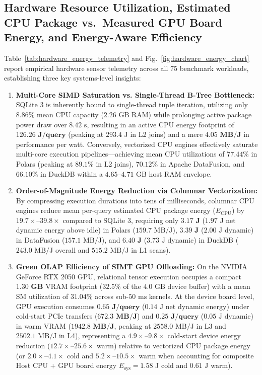 \documentclass[10pt,a4paper]{article}
\begin{document}
\subsection{Hardware Resource Utilization, Estimated CPU Package vs.\ Measured GPU Board Energy, and Energy-Aware Efficiency}
Table~\ref{tab:hardware_energy_telemetry} and Fig.~\ref{fig:hardware_energy_chart} report empirical hardware sensor telemetry across all 75 benchmark workloads, establishing three key systems-level insights:
\begin{enumerate}[leftmargin=1.5em,itemsep=2pt]
    \item \textbf{Multi-Core SIMD Saturation vs. Single-Thread B-Tree Bottleneck:} SQLite 3 is inherently bound to single-thread tuple iteration, utilizing only $8.86\%$ mean CPU capacity ($2.26\text{ GB}$ RAM) while prolonging active package power draw over $8.42\text{ s}$, resulting in an active CPU energy footprint of $\mathbf{126.26\text{ J/query}}$ (peaking at $293.4\text{ J}$ in L2 joins) and a mere $\mathbf{4.05\text{ MB/J}}$ in performance per watt. Conversely, vectorized CPU engines effectively saturate multi-core execution pipelines---achieving mean CPU utilizations of $\mathbf{77.44\%}$ in Polars (peaking at $89.1\%$ in L2 joins), $\mathbf{70.12\%}$ in Apache DataFusion, and $\mathbf{66.10\%}$ in DuckDB within a $4.65\text{--}4.71\text{ GB}$ host RAM envelope.
    \item \textbf{Order-of-Magnitude Energy Reduction via Columnar Vectorization:} By compressing execution durations into tens of milliseconds, columnar CPU engines reduce mean per-query estimated CPU package energy ($E_{\text{CPU}}$) by $19.7\times\text{--}39.8\times$ compared to SQLite 3, requiring only $\mathbf{3.17\text{ J}}$ ($1.97\text{ J}$ net dynamic energy above idle) in Polars ($159.7\text{ MB/J}$), $\mathbf{3.39\text{ J}}$ ($2.00\text{ J}$ dynamic) in DataFusion ($157.1\text{ MB/J}$), and $\mathbf{6.40\text{ J}}$ ($3.73\text{ J}$ dynamic) in DuckDB ($243.0\text{ MB/J}$ overall and $515.2\text{ MB/J}$ in L1 scans).
    \item \textbf{Green OLAP Efficiency of SIMT GPU Offloading:} On the NVIDIA GeForce RTX 2050 GPU, relational tensor execution occupies a compact $\mathbf{1.30\text{ GB}}$ VRAM footprint ($32.5\%$ of the $4.0\text{ GB}$ device buffer) with a mean SM utilization of $\mathbf{31.04\%}$ across sub-$50\text{ ms}$ kernels. At the device board level, GPU execution consumes $\mathbf{0.65\text{ J/query}}$ ($0.14\text{ J}$ net dynamic energy) under cold-start PCIe transfers ($\mathbf{672.3\text{ MB/J}}$) and $\mathbf{0.25\text{ J/query}}$ ($0.05\text{ J}$ dynamic) in warm VRAM ($\mathbf{1942.8\text{ MB/J}}$, peaking at $2558.0\text{ MB/J}$ in L3 and $2502.1\text{ MB/J}$ in L4), representing a $\mathbf{4.9\times\text{--}9.8\times}$ cold-start device energy reduction ($12.7\times\text{--}25.6\times$ warm) relative to vectorized CPU package energy (or $2.0\times\text{--}4.1\times$ cold and $5.2\times\text{--}10.5\times$ warm when accounting for composite Host CPU + GPU board energy $E_{\text{sys}} = 1.58\text{ J}$ cold and $0.61\text{ J}$ warm).
\end{enumerate}
\end{document}
